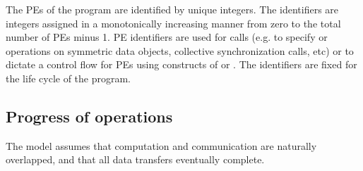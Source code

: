 The \ac{PE}{}s of the \openshmem{} program are identified by unique integers. The identifiers are integers assigned in a monotonically increasing manner from zero to the total number of \ac{PE}s minus 1. \ac{PE} identifiers are used for \openshmem{} calls (e.g. to specify \PUT{} or \GET{} operations on symmetric data objects, collective synchronization calls, etc) or to dictate a control flow for \ac{PE}s using constructs of \Clang{} or \Fortran. The identifiers are fixed for the life cycle of the \openshmem{} program.


\subsection{Progress of \openshmem operations}
The \openshmem model assumes that computation and communication are
naturally overlapped, and that all data transfers eventually complete. 

